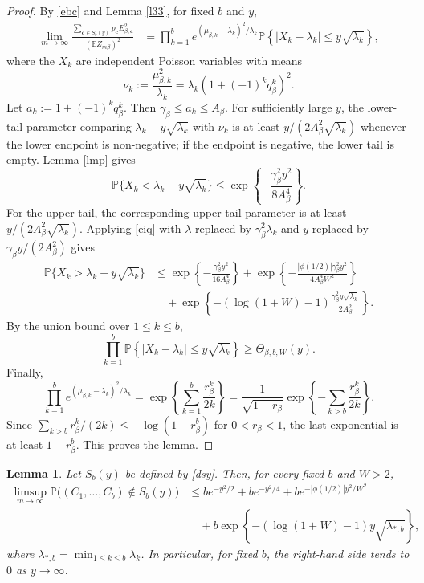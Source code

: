 \documentclass[11pt]{amsart}
\theoremstyle{plain}
\newtheorem{lemma}[theorem]{Lemma}
\numberwithin{equation}{section}
\numberwithin{theorem}{section}
\numberwithin{figure}{section}
\begin{document}
\begin{proof}
By \eqref{ebc} and Lemma \ref{l33}, for fixed \(b\) and \(y\),
\begin{align*}
\lim_{m\to\infty}
\frac{\sum_{\mathbf c\in S_b(y)}p_{\mathbf c}E_{\beta,\mathbf c}^2}
     {(\mathbb E Z_{m\beta})^2}
&=\prod_{k=1}^b
  e^{(\mu_{\beta,k}-\lambda_k)^2/\lambda_k}
  \mathbb P\left\{|X_k-\lambda_k|\le y\sqrt{\lambda_k}\right\},
\end{align*}
where the \(X_k\) are independent Poisson variables with means
\[
  \nu_k:=\frac{\mu_{\beta,k}^2}{\lambda_k}
  =\lambda_k\left(1+(-1)^kq_\beta^k\right)^2 .
\]
Let \(a_k:=1+(-1)^kq_\beta^k\).  Then
\(\gamma_\beta\le a_k\le A_\beta\).  For sufficiently large \(y\), the lower-tail
parameter comparing \(\lambda_k-y\sqrt{\lambda_k}\) with \(\nu_k\) is at least
\(y/(2A_\beta^2\sqrt{\lambda_k})\) whenever the lower endpoint is non-negative;
if the endpoint is negative, the lower tail is empty.  Lemma \ref{lmp} gives
\[
  \mathbb P\{X_k<\lambda_k-y\sqrt{\lambda_k}\}
  \le \exp\left\{-\frac{\gamma_\beta^2y^2}{8A_\beta^4}\right\}.
\]
For the upper tail, the corresponding upper-tail parameter is at least
\(y/(2A_\beta^2\sqrt{\lambda_k})\).  Applying \eqref{eiq} with
\(\lambda\) replaced by \(\gamma_\beta^2\lambda_k\) and
\(y\) replaced by \(\gamma_\beta y/(2A_\beta^2)\) gives
\begin{align*}
\mathbb P\{X_k>\lambda_k+y\sqrt{\lambda_k}\}
&\le
\exp\left\{-\frac{\gamma_\beta^2y^2}{16A_\beta^4}\right\}
+
\exp\left\{-\frac{|\phi(1/2)|\gamma_\beta^2y^2}{4A_\beta^4W^2}\right\} \\
&\quad+
\exp\left\{-(\log(1+W)-1)
       \frac{\gamma_\beta^2y\sqrt{\lambda_k}}{2A_\beta^2}\right\}.
\end{align*}
By the union bound over \(1\le k\le b\),
\[
  \prod_{k=1}^b
  \mathbb P\left\{|X_k-\lambda_k|\le y\sqrt{\lambda_k}\right\}
  \ge \Theta_{\beta,b,W}(y).
\]
Finally,
\[
  \prod_{k=1}^b e^{(\mu_{\beta,k}-\lambda_k)^2/\lambda_k}
  =\exp\left\{\sum_{k=1}^b\frac{r_\beta^k}{2k}\right\}
  =\frac1{\sqrt{1-r_\beta}}
     \exp\left\{-\sum_{k>b}\frac{r_\beta^k}{2k}\right\}.
\]
Since
\(\sum_{k>b} r_\beta^k/(2k)\le -\log(1-r_\beta^b)\) for \(0<r_\beta<1\), the last
exponential is at least \(1-r_\beta^b\).  This proves the lemma.
\end{proof}

\begin{lemma}\label{l36}
Let \(S_b(y)\) be defined by \eqref{dsy}.  Then, for every fixed \(b\) and \(W>2\),
\begin{align*}
\limsup_{m\to\infty}\mathbb P\bigl((C_1,\ldots,C_b)\notin S_b(y)\bigr)
&\le
b e^{-y^2/2}+b e^{-y^2/4}+b e^{-|\phi(1/2)|y^2/W^2} \\
&\quad+
 b\exp\left\{-(\log(1+W)-1)y\sqrt{\lambda_{*,b}}\right\},
\end{align*}
where \(\lambda_{*,b}=\min_{1\le k\le b}\lambda_k\).
In particular, for fixed \(b\), the right-hand side tends to \(0\) as \(y\to\infty\).
\end{lemma}
\end{document}
